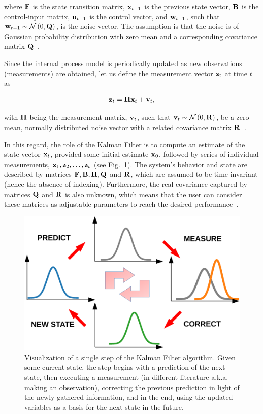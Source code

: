 \noindent  where $\mathbf{F}$ is the state transition matrix, $\mathbf{x}_{t - 1}$ is the previous state vector, $\mathbf{B}$ is the control-input matrix, $\mathbf{u}_{t - 1}$ is the control vector, and $\mathbf{w}_{t - 1}$, such that $\mathbf{w}_{t - 1} \sim \mathcal{N} \left( {0, \mathbf{Q}} \right)$, is the noise vector. The assumption is that the noise is of Gaussian probability distribution with zero mean and a corresponding covariance matrix $\mathbf{Q}$~\cite{kim2018introduction}.

Since the internal process model is periodically updated as new observations (measurements) are obtained, let us define the measurement vector $\mathbf{z}_t$ at time $t$ as

\begin{equation}
    \mathbf{z}_t = \mathbf{H} \mathbf{x}_t + \mathbf{v}_t,
\end{equation}

\noindent with $\mathbf{H}$ being the measurement matrix, $\mathbf{v}_t$, such that $\mathbf{v}_{t} \sim \mathcal{N} \left( {0, \mathbf{R}} \right)$, be a zero mean, normally distributed noise vector with a related covariance matrix $\mathbf{R}$~\cite{kim2018introduction}.

In this regard, the role of the Kalman Filter is to compute an estimate of the state vector $\mathbf{x}_t$, provided some initial estimate $\mathbf{x}_0$, followed by series of individual measurements, $\mathbf{z}_1, \mathbf{z}_2, \dots, \mathbf{z}_t$ (see Fig.~\ref{fig:KalmanFilterDiagram}). The system's behavior and state are described by matrices $\mathbf{F}, \mathbf{B}, \mathbf{H}, \mathbf{Q}$ and $\mathbf{R}$, which are assumed to be time-invariant (hence the absence of indexing). Furthermore, the real covariance captured by matrices $\mathbf{Q}$ and $\mathbf{R}$ is also unknown, which means that the user can consider these matrices as adjustable parameters to reach the desired performance~\cite{kim2018introduction}.

\begin{figure}[t]
    \centerline{\includegraphics[width=0.7\linewidth]{figures/theoretical_foundations/kalman_filter_diagram.pdf}}
    \caption[A single iteration of the Kalman Filter]{Visualization of a single step of the Kalman Filter algorithm. Given some current state, the step begins with a prediction of the next state, then executing a measurement (in different literature a.k.a. making an observation), correcting the previous prediction in light of the newly gathered information, and in the end, using the updated variables as a basis for the next state in the future.}
    \label{fig:KalmanFilterDiagram}
\end{figure}

